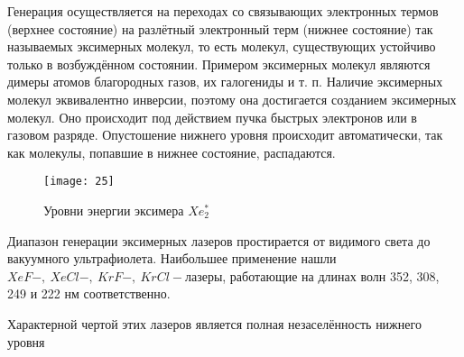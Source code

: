 Генерация осуществляется на переходах со связывающих электронных термов 
(верхнее состояние) на разлётный электронный терм (нижнее состояние) так 
называемых эксимерных молекул, то есть молекул, существующих устойчиво только 
в возбуждённом состоянии. Примером эксимерных молекул являются димеры атомов 
благородных газов, их галогениды и т. п. Наличие эксимерных молекул 
эквивалентно инверсии, поэтому она достигается созданием эксимерных молекул. 
Оно происходит под действием пучка быстрых электронов или в газовом разряде. 
Опустошение нижнего уровня происходит автоматически, так как молекулы, 
попавшие в нижнее состояние, распадаются.

\begin{figure}[h]
    \center
    \texttt{[image: 25]}
    \caption{Уровни энергии эксимера \( Xe_2^* \)}
\end{figure}

Диапазон генерации эксимерных лазеров простирается от видимого света до 
вакуумного ультрафиолета. Наибольшее применение нашли 
\( XeF-,\ XeCl-,\ KrF-,\ KrCl- \)лазеры, работающие на длинах волн 352, 
308, 249 и 222 нм соответственно.

Характерной чертой этих лазеров является полная незаселённость нижнего уровня